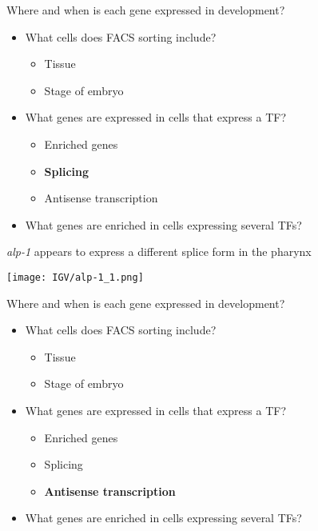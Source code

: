 \documentclass[serif,9pt]{beamer}
\begin{document}
\begin{frame}{Where and when is each gene expressed in development?}
\begin{itemize}
\item What cells does FACS sorting include?
\begin{itemize}
\item Tissue
\item Stage of embryo
\end{itemize}
\item What genes are expressed in cells that express a TF?
\begin{itemize}
\item Enriched genes
\item {\bf Splicing}
\item Antisense transcription
\end{itemize}
\item What genes are enriched in cells expressing several TFs?
\end{itemize}
\end{frame}

\begin{frame}{{\em alp-1} appears to express a different splice form in the pharynx}
\begin{center}
\texttt{[image: IGV/alp-1\_1.png]}
\end{center} 
\end{frame}

\begin{frame}{Where and when is each gene expressed in development?}
\begin{itemize}
\item What cells does FACS sorting include?
\begin{itemize}
\item Tissue
\item Stage of embryo
\end{itemize}
\item What genes are expressed in cells that express a TF?
\begin{itemize}
\item Enriched genes
\item Splicing
\item {\bf Antisense transcription}
\end{itemize}
\item What genes are enriched in cells expressing several TFs?
\end{itemize}
\end{frame}
\end{document}
